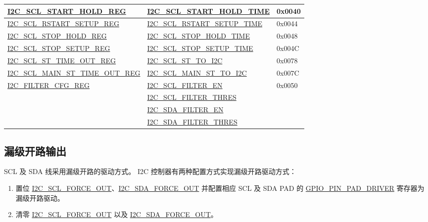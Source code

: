 \documentclass[main\_\_CN.tex]{subfiles}
\begin{document}
\begin{longtable}{ | p{6cm} | p{7cm} | p{2cm} | }
\hyperref[regdesc:I2CSCLSTARTHOLDREG]{I2C\_SCL\_START\_HOLD\_REG} & \hyperref[fielddesc:I2CSCLSTARTHOLDTIME]{I2C\_SCL\_START\_HOLD\_TIME} & 0x0040  \\ \hline
\hyperref[regdesc:I2CSCLRSTARTSETUPREG]{I2C\_SCL\_RSTART\_SETUP\_REG} & \hyperref[fielddesc:I2CSCLRSTARTSETUPTIME]{I2C\_SCL\_RSTART\_SETUP\_TIME} & 0x0044  \\ \hline

\hyperref[regdesc:I2CSCLSTOPHOLDREG]{I2C\_SCL\_STOP\_HOLD\_REG} & \hyperref[fielddesc:I2CSCLSTOPHOLDTIME]{I2C\_SCL\_STOP\_HOLD\_TIME} & 0x0048  \\ \hline
\hyperref[regdesc:I2CSCLSTOPSETUPREG]{I2C\_SCL\_STOP\_SETUP\_REG} & \hyperref[fielddesc:I2CSCLSTOPSETUPTIME]{I2C\_SCL\_STOP\_SETUP\_TIME} & 0x004C  \\ \hline

\hyperref[regdesc:I2CSCLSTTIMEOUTREG]{I2C\_SCL\_ST\_TIME\_OUT\_REG}& \hyperref[fielddesc:I2CSCLSTTOI2C]{I2C\_SCL\_ST\_TO\_I2C} & 0x0078\\ \hline
\hyperref[regdesc:I2CSCLMAINSTTIMEOUTREG]{I2C\_SCL\_MAIN\_ST\_TIME\_OUT\_REG}& \hyperref[fielddesc:I2CSCLMAINSTTOI2C]{I2C\_SCL\_MAIN\_ST\_TO\_I2C} & 0x007C\\ \hline


\hyperref[regdesc:I2CFILTERCFGREG]{I2C\_FILTER\_CFG\_REG} & {\hyperref[fielddesc:I2CSCLFILTEREN]{I2C\_SCL\_FILTER\_EN}} & 0x0050  \\\cline{2-2}
& {\hyperref[fielddesc:I2CSCLFILTERTHRES]{I2C\_SCL\_FILTER\_THRES}}& \\\cline{2-2}
& {\hyperref[fielddesc:I2CSDAFILTEREN]{I2C\_SDA\_FILTER\_EN}} &  \\\cline{2-2}
& {\hyperref[fielddesc:I2CSDAFILTERTHRES]{I2C\_SDA\_FILTER\_THRES}} & \\ \hline
\end{longtable}

\subsection{漏级开路输出}
SCL 及 SDA 线采用漏级开路的驱动方式。 I2C 控制器有两种配置方式实现漏级开路驱动方式：
\begin{enumerate}
\item 置位 \hyperref[fielddesc:I2CSCLFORCEOUT]{I2C\_SCL\_FORCE\_OUT}、\hyperref[fielddesc:I2CSDAFORCEOUT]{I2C\_SDA\_FORCE\_OUT} 并配置相应 SCL 及 SDA PAD 的 \hyperref[fielddesc:GPIOPINNPADDRIVER]{GPIO\_PIN\_PAD\_DRIVER} 寄存器为漏级开路驱动。
\item 清零 \hyperref[fielddesc:I2CSCLFORCEOUT]{I2C\_SCL\_FORCE\_OUT} 以及 \hyperref[fielddesc:I2CSDAFORCEOUT]{I2C\_SDA\_FORCE\_OUT}。
\end{enumerate}
\end{document}
